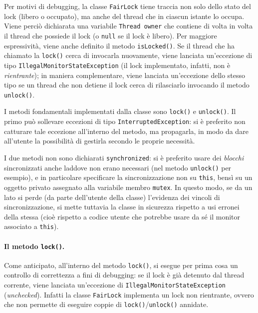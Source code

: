 \documentclass[a4paper,twoside]{article}
\newcommand\code{\lstinline[basicstyle=\normalsize\ttfamily]}
\begin{document}
Per motivi di debugging, la classe \code|FairLock| tiene traccia non solo dello stato del lock (libero o occupato), ma anche del thread che in ciascun istante lo occupa. Viene perciò dichiarata una variabile \code|Thread owner| che contiene di volta in volta il thread che possiede il lock (o \code|null| se il lock è libero). Per maggiore espressività, viene anche definito il metodo \code|isLocked()|. Se il thread che ha chiamato la \code|lock()| cerca di invocarla nuovamente, viene lanciata un'eccezione di tipo \code|IllegalMonitorStateException| (il lock implementato, infatti, non è \emph{rientrante}); in maniera complementare, viene lanciata un'eccezione dello stesso tipo se un thread che non detiene il lock cerca di rilasciarlo invocando il metodo \code|unlock()|.

I metodi fondamentali implementati dalla classe sono \code|lock()| e \code|unlock()|. Il primo può sollevare eccezioni di tipo \code|InterruptedException|: si è preferito non catturare tale eccezione all'interno del metodo, ma propagarla, in modo da dare all'utente la possibilità di gestirla secondo le proprie necessità.

I due metodi non sono dichiarati \code|synchronized|: si è preferito usare dei \emph{blocchi} sincronizzati anche laddove non erano necessari (nel metodo \code|unlock()| per esempio), e in particolare specificare la sincronizzazione non su \code|this|, bensì su un oggetto privato assegnato alla variabile membro \code|mutex|. In questo modo, se da un lato si perde (da parte dell'utente della classe) l'evidenza dei vincoli di sincronizzazione, si mette tuttavia la classe in sicurezza rispetto a usi erronei della stessa (cioè rispetto a codice utente che potrebbe usare da sé il monitor associato a \code|this|).



\paragraph{Il metodo \texttt{lock()}.}
Come anticipato, all'interno del metodo \code|lock()|, si esegue per prima cosa un controllo di correttezza a fini di debugging: se il lock è già detenuto dal thread corrente, viene lanciata un'eccezione di \code|IllegalMonitorStateException| (\emph{unchecked}). Infatti la classe \code|FairLock| implementa un lock non rientrante, ovvero che non permette di eseguire coppie di \code|lock()|/\code|unlock()| annidate.
\end{document}
